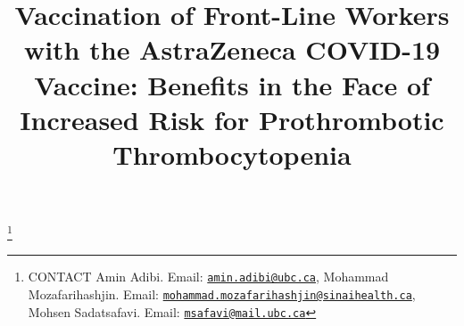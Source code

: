 \documentclass[]{interact}
\theoremstyle{plain}%
\theoremstyle{definition}
\theoremstyle{remark}
\begin{document}

\title{Vaccination of Front-Line Workers with the AstraZeneca COVID-19
Vaccine: Benefits in the Face of Increased Risk for Prothrombotic
Thrombocytopenia}


\author{
}

\thanks{CONTACT Amin
Adibi. Email: \href{mailto:amin.adibi@ubc.ca}{\nolinkurl{amin.adibi@ubc.ca}}, Mohammad
Mozafarihashjin. Email: \href{mailto:mohammad.mozafarihashjin@sinaihealth.ca}{\nolinkurl{mohammad.mozafarihashjin@sinaihealth.ca}}, Mohsen
Sadatsafavi. Email: \href{mailto:msafavi@mail.ubc.ca}{\nolinkurl{msafavi@mail.ubc.ca}}}

\maketitle
\end{document}
